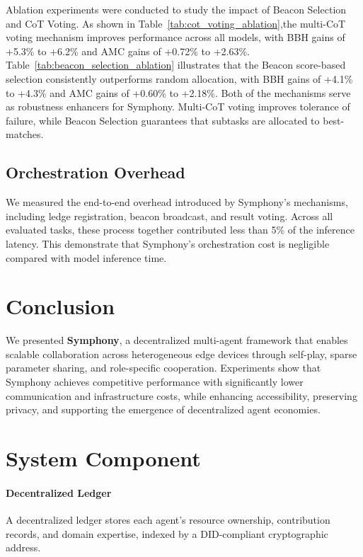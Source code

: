 \documentclass{article}
\begin{document}
Ablation experiments were conducted to study the impact of Beacon Selection and CoT Voting. As shown in Table~\ref{tab:cot_voting_ablation},the multi-CoT voting mechanism improves performance across all models, with BBH gains of +5.3\% to +6.2\% and AMC gains of +0.72\% to +2.63\%. Table~\ref{tab:beacon_selection_ablation} illustrates that the Beacon score-based selection consistently outperforms random allocation, with BBH gains of +4.1\% to +4.3\% and AMC gains of +0.60\% to +2.18\%. Both of the mechanisms serve as robustness enhancers for Symphony. Multi-CoT voting improves tolerance of failure, while Beacon Selection guarantees that subtasks are allocated to best-matches.

\subsection{Orchestration Overhead}

We measured the end-to-end overhead introduced by Symphony's mechanisms, including ledge registration, beacon broadcast, and result voting. Across all evaluated tasks, these process together contributed less than 5\% of the inference latency. This demonstrate that Symphony's orchestration cost is negligible compared with model inference time. 

\section{Conclusion}
We presented \textbf{Symphony}, a decentralized multi-agent framework that enables scalable collaboration across heterogeneous edge devices through self-play, sparse parameter sharing, and role-specific cooperation. Experiments show that Symphony achieves competitive performance with significantly lower communication and infrastructure costs, while enhancing accessibility, preserving privacy, and supporting the emergence of decentralized agent economies.




\appendix

\section{System Component}
\label{app:system_component}


\paragraph{Decentralized Ledger}
A decentralized ledger stores each agent’s resource ownership, contribution records, and domain expertise, indexed by a DID-compliant cryptographic address. 
\end{document}

